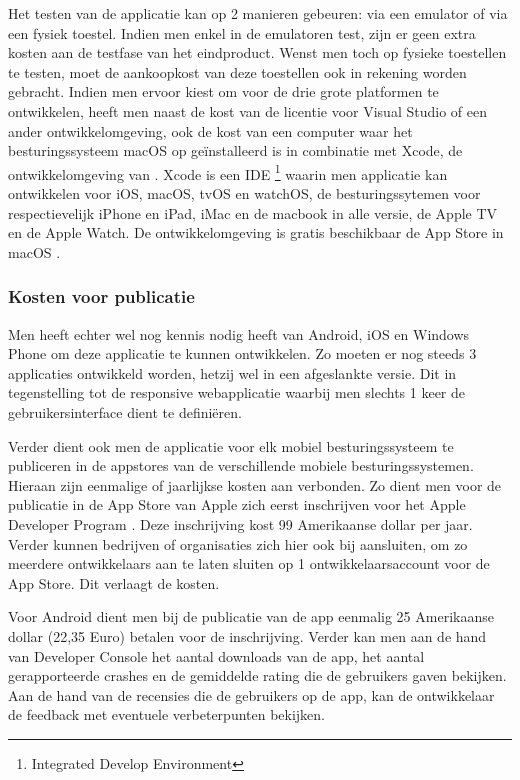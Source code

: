 Het testen van de applicatie kan op 2 manieren gebeuren: via een emulator of via een fysiek toestel. Indien men enkel in de emulatoren test, zijn er geen extra kosten aan de testfase van het eindproduct.
Wenst men toch op fysieke toestellen te testen, moet de aankoopkost van deze toestellen ook in rekening worden gebracht.
\newpage
Indien men ervoor kiest om voor de drie grote platformen te ontwikkelen, heeft men naast de kost van de licentie voor Visual Studio of een ander ontwikkelomgeving,
ook de kost van een computer waar het besturingssysteem macOS op geïnstalleerd is in combinatie met Xcode, de ontwikkelomgeving van \cite{xcodemacappstore2017}.
Xcode is een IDE \footnote{Integrated Develop Environment} waarin men applicatie kan ontwikkelen voor iOS, macOS, tvOS en watchOS, de besturingssytemen voor respectievelijk iPhone en iPad,
iMac en de macbook in alle versie, de Apple TV en de Apple Watch. De ontwikkelomgeving is gratis beschikbaar de App Store in macOS .

\subsubsection{Kosten voor publicatie}
Men heeft echter wel nog kennis nodig heeft van Android, iOS en Windows Phone om deze applicatie te
kunnen ontwikkelen. Zo moeten er nog steeds 3 applicaties ontwikkeld worden, hetzij wel in een afgeslankte versie.
Dit in tegenstelling tot de responsive webapplicatie waarbij men slechts 1 keer de gebruikersinterface dient te definiëren.

Verder dient ook men de applicatie voor elk mobiel besturingssysteem te publiceren in de appstores van de verschillende
mobiele besturingssystemen. Hieraan zijn  eenmalige of jaarlijkse kosten aan verbonden. Zo dient men voor de publicatie in de App Store van Apple zich eerst inschrijven voor het
Apple Developer Program \citep{appledeveloperprograms2017} . Deze inschrijving kost 99 Amerikaanse dollar per jaar. Verder kunnen bedrijven of organisaties
zich hier ook bij aansluiten, om zo meerdere ontwikkelaars aan te laten sluiten op 1 ontwikkelaarsaccount voor de App Store.
Dit verlaagt de kosten.

Voor Android dient men bij de publicatie van de app \citep{getstartedwithpublishingandroiddevelopers2017} eenmalig 25 Amerikaanse dollar (22,35 Euro) betalen voor de inschrijving.
Verder kan men aan de hand van Developer Console het aantal downloads van de app, het aantal gerapporteerde crashes en de gemiddelde rating die de gebruikers gaven bekijken.
Aan de hand van de recensies die de gebruikers op de app, kan de ontwikkelaar de feedback met eventuele verbeterpunten bekijken.

